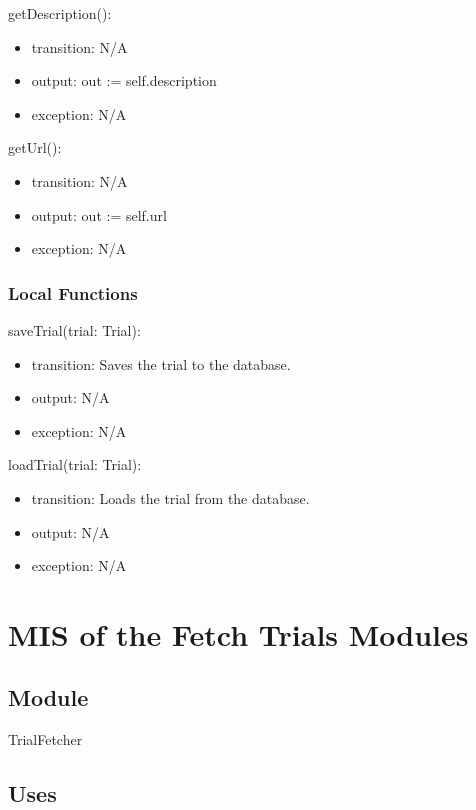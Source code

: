 \documentclass[12pt, titlepage]{article}
\begin{document}
\noindent getDescription():
\begin{itemize}
\item transition: N/A
\item output: out := self.description
\item exception: N/A
\end{itemize}

\noindent getUrl():
\begin{itemize}
\item transition: N/A
\item output: out := self.url
\item exception: N/A
\end{itemize}

\subsubsection{Local Functions}
\noindent saveTrial(trial: Trial):
\begin{itemize}
\item transition: Saves the trial to the database.
\item output: N/A
\item exception: N/A
\end{itemize}

\noindent loadTrial(trial: Trial):
\begin{itemize}
\item transition: Loads the trial from the database.
\item output: N/A
\item exception: N/A
\end{itemize}

\newpage



\section{MIS of the Fetch Trials Modules} \label{TrialFetcher}

\subsection{Module}

TrialFetcher

\subsection{Uses}
\end{document}
